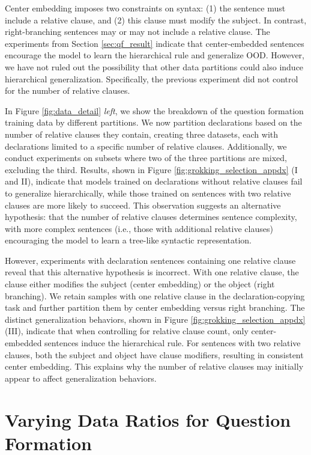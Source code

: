 Center embedding imposes two constraints on syntax: (1) the sentence must include a relative clause, and (2) this clause must modify the subject. In contrast, right-branching sentences may or may not include a relative clause. The experiments from Section \ref{sec:qf_result} indicate that center-embedded sentences encourage the model to learn the hierarchical rule and generalize OOD. However, we have not ruled out the possibility that other data partitions could also induce hierarchical generalization. Specifically, the previous experiment did not control for the number of relative clauses.


In Figure \ref{fig:data_detail} \textit{left}, we show the breakdown of the question formation training data by different partitions. We now partition declarations based on the number of relative clauses they contain, creating three datasets, each with declarations limited to a specific number of relative clauses. Additionally, we conduct experiments on subsets where two of the three partitions are mixed, excluding the third. Results, shown in Figure \ref{fig:grokking_selection_appdx} (I and II), indicate that models trained on declarations without relative clauses fail to generalize hierarchically, while those trained on sentences with two relative clauses are more likely to succeed. This observation suggests an alternative hypothesis: that the number of relative clauses determines sentence complexity, with more complex sentences (i.e., those with additional relative clauses) encouraging the model to learn a tree-like syntactic representation.


However, experiments with declaration sentences containing one relative clause reveal that this alternative hypothesis is incorrect. 
With one relative clause, the clause either modifies the subject (center embedding) or the object (right branching). We retain samples with one relative clause in the declaration-copying task and further partition them by center embedding versus right branching. The distinct generalization behaviors, shown in Figure \ref{fig:grokking_selection_appdx} (III), indicate that when controlling for relative clause count, only center-embedded sentences induce the hierarchical rule. For sentences with two relative clauses, both the subject and object have clause modifiers, resulting in consistent center embedding. This explains why the number of relative clauses may initially appear to affect generalization behaviors.

\fi


\section{Varying Data Ratios for Question Formation}
\label{sec:simple_mixin}


